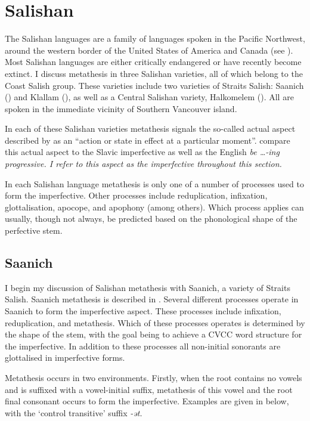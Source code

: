 \section{Salishan}\label{sec:Sal}
The Salishan languages are a family of languages spoken in the Pacific Northwest,
around the western border of the United States of America and Canada (see ).
Most Salishan languages are either critically endangered or have recently become extinct.
I discuss metathesis in three Salishan varieties, all of which belong to the Coast Salish group.
These varieties include two varieties of Straits Salish:
Saanich () and Klallam (),
as well as a Central Salishan variety, Halkomelem ().
All are spoken in the immediate vicinity of Southern Vancouver island.

In each of these Salishan varieties metathesis signals the so-called
actual aspect described by \citet[215]{thth69}
as an ``action or state in effect at a particular moment''.
\citeauthor{thth69} compare this actual aspect to the Slavic imperfective
as well as the English \it{be {\ldots}-ing} progressive.
I refer to this aspect as the imperfective  throughout this section.

In each Salishan language metathesis is only one of a number of processes used to form the imperfective.
Other processes include reduplication, infixation,
glottalisation, apocope, and apophony (among others).
Which process applies can usually, though not always, be predicted based
on the phonological shape of the perfective stem.

\subsection{Saanich}\label{sec:Saa}
I begin my discussion of Salishan metathesis with Saanich,
a variety of Straits Salish.
Saanich metathesis is described in \cite{mo86,mo89}.
Several different processes operate in Saanich to form the imperfective aspect.
These processes include infixation, reduplication, and metathesis.
Which of these processes operates is determined by the shape of the stem,
with the goal being to achieve a CVCC word structure for the imperfective.
In addition to these processes
all non-initial sonorants are glottalised in imperfective forms.

Metathesis occurs in two environments.
Firstly, when the root contains no vowels
and is suffixed with a vowel-initial suffix,
metathesis of this vowel and the root final consonant
occurs to form the imperfective.
Examples are given in  below,
with the `control transitive' suffix \it{-ət}.

